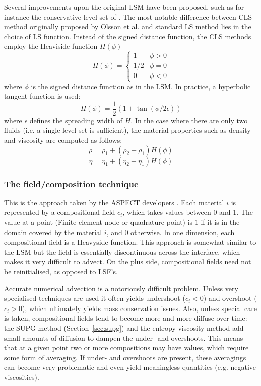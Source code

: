 Several improvements upon the original LSM have been proposed, 
such as for instance the conservative level set of \cite{zhbl14}.
The most notable difference between CLS method originally proposed by Olsson et al. \cite{olkr05,olkz07}
and standard LS method lies in the choice of LS function. Instead of the signed distance function, the
CLS methods employ the Heaviside function $H(\phi)$ 
\[
H(\phi)=
\left\{
\begin{array}{ll}
1 & \phi>0 \\
1/2 & \phi=0 \\
0 & \phi<0
\end{array}
\right.
\]
where $\phi$ is the signed distance function as in the LSM. 
In practice, a hyperbolic tangent function is used:
\[
H(\phi) = \frac{1}{2} (1+\tan (\phi/2\epsilon))
\]
where $\epsilon$ defines the spreading width of $H$. In the case where there are only 
two fluids (i.e. a single level set is sufficient), the material properties such as density and viscosity
are computed as follows:
\[
\rho=\rho_1+(\rho_2-\rho_1)H(\phi)
\]
\[
\eta=\eta_1+(\eta_2-\eta_1)H(\phi)
\]



\subsubsection{The field/composition technique}

This is the approach taken by the ASPECT developers \cite{krhb12,hedg17}. 
Each material $i$ is represented by a compositional field $c_i$, 
which takes values between 0 and 1.
The value at a point (Finite element node or quadrature point) is 1 if it is in the 
domain covered by the material $i$, and 0 otherwise.
In one dimension, each compositional field is a Heavyside function. 
This approach is somewhat similar to the LSM but the field is essentially 
discontinuous across the interface, which makes it very difficult to advect.  
On the plus side, compositional fields need not be reinitialised, as opposed to LSF's.

Accurate numerical advection is a notoriously difficult problem. Unless very specialised 
techniques are used it often yields undershoot ($c_i<0$) and overshoot ($c_i>0$), which 
ultimately yields mass conservation issues. Also, unless special care is taken, 
compositional fields tend to become more and more diffuse over time: the SUPG method (Section~\ref{sec:supg})
and the entropy viscosity method add small amounts of diffusion to dampen the under- and 
overshoots. This means that at a given point two or more compositions may have values, 
which require some form of averaging. If under- and overshoots are present, these averagings
can become very problematic and even yield meaningless quantities (e.g. negative viscosities).

